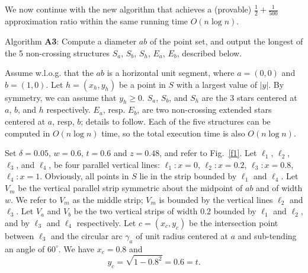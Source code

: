 \documentclass[proceedings]{stacs}
\begin{document}
We now continue with the new algorithm that achieves a (provable)
$ \frac{1}{2} + \frac{1}{500}$ approximation ratio within the same
running time $O(n \log{n})$.


\smallskip
\noindent Algorithm {\bf A3}: Compute a diameter $ab$ of the point
set, and output the longest of the 5 non-crossing structures
$S_a$, $S_b$, $S_h$, $E_a$, $E_b$, described below.

\smallskip
Assume w.l.o.g. that the $ab$ is a horizontal unit segment, where
$a=(0,0)$ and $b=(1,0)$.
Let $h=(x_h,y_h)$ be a point in $S$ with a largest value of $|y|$.
By symmetry, we can assume that $y_h \geq 0$.
$S_a$, $S_b$, and $S_h$ are the 3 stars centered at $a$, $b$, and
$h$ respectively. $E_a$, resp. $E_b$, are two non-crossing
extended stars centered at $a$, resp, $b$; details to follow.
Each of the five structures can be computed in $O(n \log{n})$
time, so the total execution time is also $O(n \log{n})$.

\smallskip
Set $\delta=0.05$, $w=0.6$, $t=0.6$ and $z=0.48$, and refer to
Fig.~\ref{f1}.  Let $\ell_1$, $\ell_2$, $\ell_3$, and $\ell_4$,
be four parallel vertical lines:
$\ell_1: x=0$,  $\ell_2: x=0.2$, $\ell_3: x=0.8$, $\ell_4: x=1$.
Obviously, all points in $S$ lie in the strip bounded by $\ell_1$ and
$\ell_4$.
Let $V_m$ be the vertical parallel strip symmetric about the midpoint
of $ab$ and of width $w$. We refer to $V_m$ as the middle strip;
$V_m$ is bounded by the vertical lines $\ell_2$ and $\ell_3$.
Let $V_a$ and $V_b$ be the two vertical strips of width $0.2$
bounded by $\ell_1$ and $\ell_2$, and by $\ell_3$ and $\ell_4$
respectively. Let $c=(x_c,y_c)$ be the intersection point between
$\ell_3$ and the circular arc $\gamma_a$ of unit radius centered at
$a$ and sub-tending an angle of $60^\circ$. We have $x_c=0.8$ and
$$ y_c = \sqrt{1-0.8^2} = 0.6= t. $$
\end{document}
